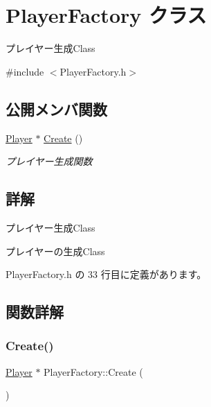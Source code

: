 \hypertarget{class_player_factory}{}\section{Player\+Factory クラス}
\label{class_player_factory}


プレイヤー生成\+Class  




{\ttfamily \#include $<$Player\+Factory.\+h$>$}

\subsection*{公開メンバ関数}
\begin{DoxyCompactItemize}
\item 
\mbox{\hyperlink{class_player}{Player}} $\ast$ \mbox{\hyperlink{class_player_factory_a3f0438e14689b1b29935bd35b001e73c}{Create}} ()
\begin{DoxyCompactList}\small\item\em プレイヤー生成関数 \end{DoxyCompactList}\end{DoxyCompactItemize}


\subsection{詳解}
プレイヤー生成\+Class 

プレイヤーの生成\+Class 

 Player\+Factory.\+h の 33 行目に定義があります。



\subsection{関数詳解}
\mbox{\label{class_player_factory_a3f0438e14689b1b29935bd35b001e73c}} 
\subsubsection{\texorpdfstring{Create()}{Create()}}
{\footnotesize\ttfamily \mbox{\hyperlink{class_player}{Player}} $\ast$ Player\+Factory\+::\+Create (\begin{DoxyParamCaption}{ }\end{DoxyParamCaption})}



